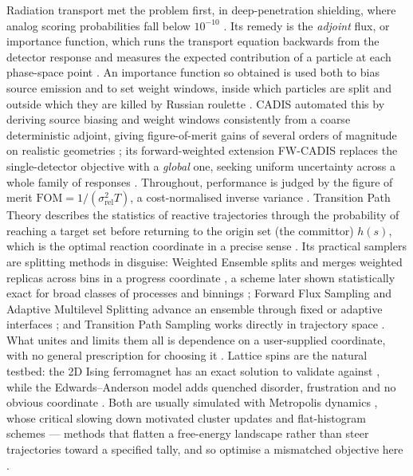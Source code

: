 \documentclass[a4paper,fleqn]{cas-sc}
\begin{document}
Radiation transport met the problem first, in deep-penetration shielding, where analog
scoring probabilities fall below $10^{-10}$ \cite{spanier1969, wagner1998}. Its remedy is
the \emph{adjoint} flux, or importance function, which runs the transport equation
backwards from the detector response and measures the expected contribution of a particle
at each phase-space point \cite{lewins1965, bell1970}. An importance function so obtained
is used both to bias source emission and to set weight windows, inside which particles are
split and outside which they are killed by Russian roulette \cite{kahn1951, booth1984}.
CADIS automated this by deriving source biasing and weight windows consistently from a
coarse deterministic adjoint, giving figure-of-merit gains of several orders of magnitude
on realistic geometries \cite{wagner1998, haghighat2003}; its forward-weighted extension
FW-CADIS replaces the single-detector objective with a \emph{global} one, seeking uniform
uncertainty across a whole family of responses \cite{wagnerfw2014, cooper2001}.
Throughout, performance is judged by the figure of merit
$\mathrm{FOM}=1/(\sigma_{\mathrm{rel}}^{2}T)$, a cost-normalised inverse variance
\cite{spanier1969, wagnerfw2014}.
Transition Path Theory describes the statistics of reactive trajectories through the probability of reaching a target set before returning to the origin set (the committor)	$h(s)$, which
is the optimal reaction coordinate in a precise sense \cite{e2006, metzner2009,
	evanden2010}. Its practical samplers are splitting methods in disguise: Weighted Ensemble
splits and merges weighted replicas across bins in a progress coordinate \cite{huber1996},
a scheme later shown statistically exact for broad classes of processes and binnings
\cite{zhang2010}; Forward Flux Sampling and Adaptive Multilevel Splitting advance an
ensemble through fixed or adaptive interfaces \cite{allen2009, cerou2007}; and Transition
Path Sampling works directly in trajectory space \cite{bolhuis2002}. What unites and
limits them all is dependence on a user-supplied coordinate, with no general prescription
for choosing it \cite{zuckerman2017, allen2009}. Lattice spins are the natural testbed:
the 2D Ising ferromagnet \cite{ising1925} has an exact solution to validate against
\cite{onsager1944}, while the Edwards--Anderson model adds quenched disorder, frustration
and no obvious coordinate \cite{edwards1975, binder1986}. Both are usually simulated with
Metropolis dynamics \cite{metropolis1953}, whose critical slowing down motivated cluster
updates \cite{swendsen1987, wolff1989} and flat-histogram schemes \cite{berg1992,
	wanglandau2001} --- methods that flatten a free-energy landscape rather than steer
trajectories toward a specified tally, and so optimise a mismatched objective here
\cite{wanglandau2001}.
\end{document}
